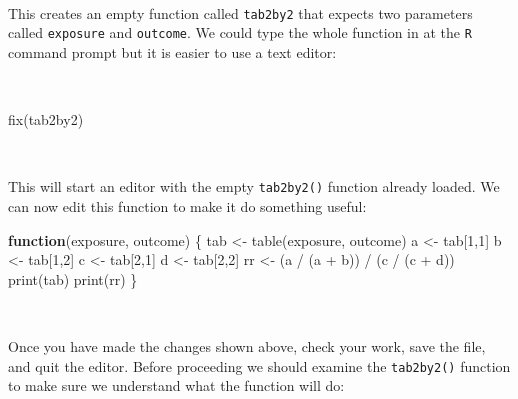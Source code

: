\documentclass[
  12pt,
  a4paper]{book}
\newenvironment{Shaded}{\begin{snugshade}}{\end{snugshade}}
\newcommand{\ControlFlowTok}[1]{\textcolor[rgb]{0.13,0.29,0.53}{\textbf{#1}}}
\newcommand{\DecValTok}[1]{\textcolor[rgb]{0.00,0.00,0.81}{#1}}
\newcommand{\FunctionTok}[1]{\textcolor[rgb]{0.00,0.00,0.00}{#1}}
\newcommand{\NormalTok}[1]{#1}
\newcommand{\OtherTok}[1]{\textcolor[rgb]{0.56,0.35,0.01}{#1}}
\newcommand{\SpecialCharTok}[1]{\textcolor[rgb]{0.00,0.00,0.00}{#1}}
\begin{document}
~

This creates an empty function called \texttt{tab2by2} that expects two parameters called \texttt{exposure} and \texttt{outcome}. We could type the whole function in at the \texttt{R} command prompt but it is easier to use a text editor:

~

\begin{Shaded}
\begin{Highlighting}[]
\FunctionTok{fix}\NormalTok{(tab2by2)}
\end{Highlighting}
\end{Shaded}

~

This will start an editor with the empty \texttt{tab2by2()} function already loaded. We can now edit this function to make it do something useful:

\newpage

\begin{Shaded}
\begin{Highlighting}[]
\ControlFlowTok{function}\NormalTok{(exposure, outcome)}
\NormalTok{  \{}
\NormalTok{  tab }\OtherTok{\textless{}{-}} \FunctionTok{table}\NormalTok{(exposure, outcome)}
\NormalTok{  a }\OtherTok{\textless{}{-}}\NormalTok{ tab[}\DecValTok{1}\NormalTok{,}\DecValTok{1}\NormalTok{]}
\NormalTok{  b }\OtherTok{\textless{}{-}}\NormalTok{ tab[}\DecValTok{1}\NormalTok{,}\DecValTok{2}\NormalTok{]}
\NormalTok{  c }\OtherTok{\textless{}{-}}\NormalTok{ tab[}\DecValTok{2}\NormalTok{,}\DecValTok{1}\NormalTok{]}
\NormalTok{  d }\OtherTok{\textless{}{-}}\NormalTok{ tab[}\DecValTok{2}\NormalTok{,}\DecValTok{2}\NormalTok{]}
\NormalTok{  rr }\OtherTok{\textless{}{-}}\NormalTok{ (a }\SpecialCharTok{/}\NormalTok{ (a }\SpecialCharTok{+}\NormalTok{ b)) }\SpecialCharTok{/}\NormalTok{ (c }\SpecialCharTok{/}\NormalTok{ (c }\SpecialCharTok{+}\NormalTok{ d))}
  \FunctionTok{print}\NormalTok{(tab)}
  \FunctionTok{print}\NormalTok{(rr) }
\NormalTok{  \}}
\end{Highlighting}
\end{Shaded}

~

Once you have made the changes shown above, check your work, save the file, and quit the editor.
Before proceeding we should examine the \texttt{tab2by2()} function to make sure we understand what the function will do:
\end{document}
